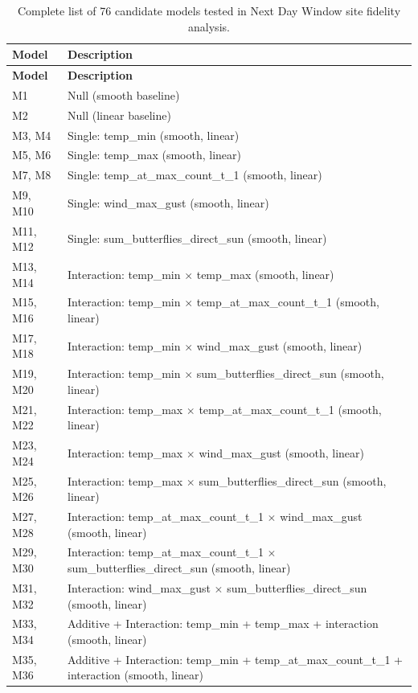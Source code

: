 \documentclass[insects,article,submit,pdftex,moreauthors]{Definitions/mdpi}
\begin{document}
\begin{appendix}
\begin{longtable}{ll}
\caption{Complete list of 76 candidate models tested in Next Day Window site fidelity analysis.} \label{tab:sunset_candidates} \\
\toprule
\textbf{Model} & \textbf{Description} \\
\midrule
\endfirsthead
\toprule
\textbf{Model} & \textbf{Description} \\
\midrule
\endhead
M1      & Null (smooth baseline) \\
M2      & Null (linear baseline) \\
M3, M4  & Single: temp\_min (smooth, linear) \\
M5, M6  & Single: temp\_max (smooth, linear) \\
M7, M8  & Single: temp\_at\_max\_count\_t\_1 (smooth, linear) \\
M9, M10 & Single: wind\_max\_gust (smooth, linear) \\
M11, M12 & Single: sum\_butterflies\_direct\_sun (smooth, linear) \\
M13, M14 & Interaction: temp\_min $\times$ temp\_max (smooth, linear) \\
M15, M16 & Interaction: temp\_min $\times$ temp\_at\_max\_count\_t\_1 (smooth, linear) \\
M17, M18 & Interaction: temp\_min $\times$ wind\_max\_gust (smooth, linear) \\
M19, M20 & Interaction: temp\_min $\times$ sum\_butterflies\_direct\_sun (smooth, linear) \\
M21, M22 & Interaction: temp\_max $\times$ temp\_at\_max\_count\_t\_1 (smooth, linear) \\
M23, M24 & Interaction: temp\_max $\times$ wind\_max\_gust (smooth, linear) \\
M25, M26 & Interaction: temp\_max $\times$ sum\_butterflies\_direct\_sun (smooth, linear) \\
M27, M28 & Interaction: temp\_at\_max\_count\_t\_1 $\times$ wind\_max\_gust (smooth, linear) \\
M29, M30 & Interaction: temp\_at\_max\_count\_t\_1 $\times$ sum\_butterflies\_direct\_sun (smooth, linear) \\
M31, M32 & Interaction: wind\_max\_gust $\times$ sum\_butterflies\_direct\_sun (smooth, linear) \\
M33, M34 & Additive + Interaction: temp\_min + temp\_max + interaction (smooth, linear) \\
M35, M36 & Additive + Interaction: temp\_min + temp\_at\_max\_count\_t\_1 + interaction (smooth, linear) \\

\end{longtable}
\end{appendix}
\end{document}
